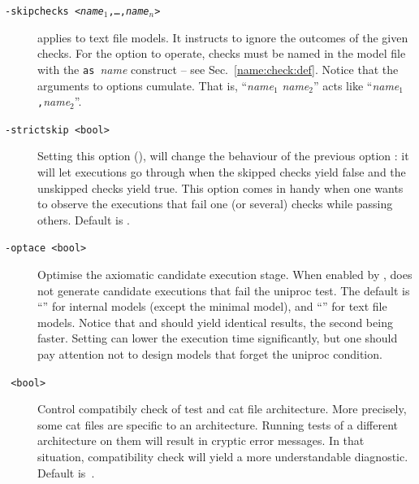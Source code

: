 \begin{description}
\item[{\tt -skipchecks <\textit{name}$_1$,\ldots,\textit{name}$_n$>}]
applies to text file models. It instructs \herd{} to ignore
the outcomes of the given checks. For the option to operate, checks must
be named in the model file with the \texttt{as }\textit{name} construct --
see Sec.~\ref{name:check:def}.
Notice that the arguments to  options cumulate.
That is, ``\textit{name}$_1$ \textit{name}$_2$'' acts like ``\textit{name}$_1$\texttt{,}\textit{name}$_2$''.

\item [{\tt -strictskip <bool>}] Setting this option (),
will change the behaviour of the previous option :
it will let executions go through when the skipped checks yield
false and the unskipped checks yield true. This option comes in handy
when one wants to observe the executions that fail one (or several) checks
while passing others. Default is .

\item[{\tt -optace <bool>}] Optimise the axiomatic candidate execution stage.
When enabled by ,  \herd{} does not generate candidate
executions that fail the uniproc test. The default is ``''
for internal models (except the minimal model), and ``'' for
text file models. Notice that 
and  should yield identical results,
the second being faster.
Setting  can lower the execution time significantly,
but one should pay attention not to design models that forget the uniproc
condition.

\item[{\tt {} <bool>}]
Control compatibily check of test and cat file
architecture. More precisely, some cat files are specific to an architecture.
Running tests of a different architecture on them will result in
cryptic error messages. In that situation, compatibility check will
yield a more understandable diagnostic. Default is~.


\end{description}

